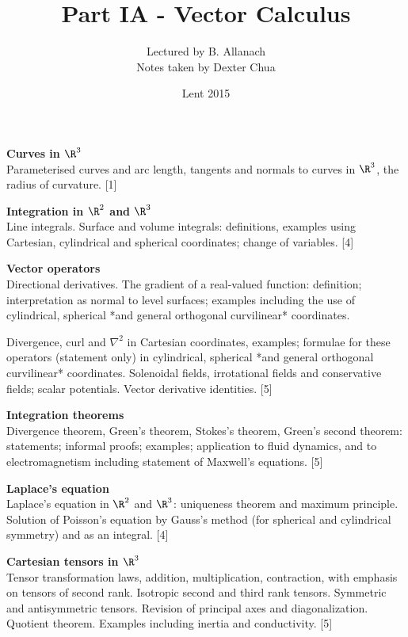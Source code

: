 \documentclass[a4paper]{article}
\title{Part IA - Vector Calculus}
\author{Lectured by B. Allanach\\\small Notes taken by Dexter Chua}
\date{Lent 2015}
\begin{document}
\maketitle
{\small
  \noindent\textbf{Curves in $\R^3$}\\ 
  Parameterised curves and arc length, tangents and normals to curves in $\R^3$, the radius of curvature.\hspace*{\fill} [1]

  \vspace{10pt}
  \noindent\textbf{Integration in $\R^2$ and $\R^3$}\\
  Line integrals. Surface and volume integrals: definitions, examples using Cartesian, cylindrical and spherical coordinates; change of variables.\hspace*{\fill} [4]

  \vspace{10pt}
  \noindent\textbf{Vector operators}\\
  Directional derivatives. The gradient of a real-valued function: definition; interpretation as normal to level surfaces; examples including the use of cylindrical, spherical *and general orthogonal curvilinear* coordinates.

  \vspace{5pt}
  \noindent Divergence, curl and $\nabla^2$ in Cartesian coordinates, examples; formulae for these operators (statement only) in cylindrical, spherical *and general orthogonal curvilinear* coordinates. Solenoidal fields, irrotational fields and conservative fields; scalar potentials. Vector derivative identities.\hspace*{\fill} [5]

  \vspace{10pt}
  \noindent\textbf{Integration theorems}\\
  Divergence theorem, Green's theorem, Stokes's theorem, Green's second theorem: statements; informal proofs; examples; application to fluid dynamics, and to electromagnetism including statement of Maxwell's equations.\hspace*{\fill} [5]

  \vspace{10pt}
  \noindent\textbf{Laplace's equation}\\
  Laplace's equation in $\R^2$ and $\R^3$: uniqueness theorem and maximum principle. Solution of Poisson's equation by Gauss's method (for spherical and cylindrical symmetry) and as an integral.\hspace*{\fill} [4]

  \vspace{10pt}
  \noindent\textbf{Cartesian tensors in $\R^3$}\\
  Tensor transformation laws, addition, multiplication, contraction, with emphasis on tensors of second rank. Isotropic second and third rank tensors. Symmetric and antisymmetric tensors. Revision of principal axes and diagonalization. Quotient theorem. Examples including inertia and conductivity.\hspace*{\fill} [5]}
\end{document}
